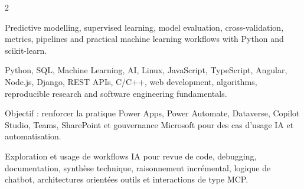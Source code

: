 \documentclass[8pt,a4paper,ragged2e,withhyper]{altacv}
\begin{document}
\begin{paracol}{2}
\divider
{}
\divider

\medskip



\divider


\divider


\divider




\small{
Predictive modelling, supervised learning, model evaluation, cross-validation, metrics, pipelines and practical machine learning workflows with Python and scikit-learn.
}

\divider


\small{
Python, SQL, Machine Learning, AI, Linux, JavaScript, TypeScript, Angular, Node.js, Django, REST APIs, C/C++, web development, algorithms, reproducible research and software engineering fundamentals.
}

\divider


\small{
Objectif : renforcer la pratique Power Apps, Power Automate, Dataverse, Copilot Studio, Teams, SharePoint et gouvernance Microsoft pour des cas d’usage IA et automatisation.
}

\end{paracol}



Exploration et usage de workflows IA pour revue de code, debugging, documentation, synthèse technique, raisonnement incrémental, logique de chatbot, architectures orientées outils et interactions de type MCP.
\end{document}
